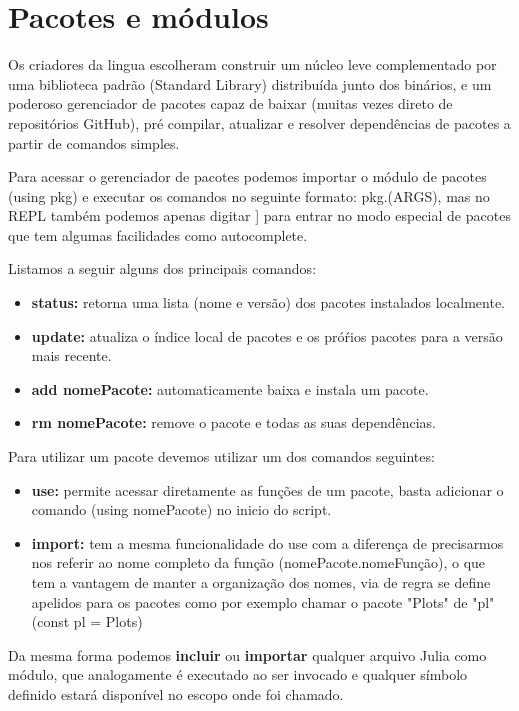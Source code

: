 \section{Pacotes e módulos}

Os criadores da lingua escolheram construir um núcleo leve complementado por uma biblioteca padrão (Standard Library) distribuída junto dos binários, e um poderoso gerenciador de pacotes capaz de baixar (muitas vezes direto de repositórios GitHub), pré compilar, atualizar e resolver dependências de pacotes a partir de comandos simples. 

Para acessar o gerenciador de pacotes podemos importar o módulo de pacotes (using pkg) e executar os comandos no seguinte formato: pkg.(ARGS), mas no REPL também podemos apenas digitar ] para entrar no modo especial de pacotes que tem algumas facilidades como autocomplete.

Listamos a seguir alguns dos principais comandos:
\begin{itemize}
    \item \textbf{status:} retorna uma lista (nome e versão) dos pacotes instalados localmente.
    \item \textbf{update:} atualiza o índice local de pacotes e os próŕios pacotes para a versão mais recente.
    \item \textbf{add nomePacote:} automaticamente baixa e instala um pacote.
    \item \textbf{rm nomePacote:} remove o pacote e todas as suas dependências.
\end{itemize}

Para utilizar um pacote devemos utilizar um dos comandos seguintes:
\begin{itemize}
    \item \textbf{use:} permite acessar diretamente as funções de um pacote, basta adicionar o comando (using nomePacote) no inicio do script. 
    \item \textbf{import:} tem a mesma funcionalidade do use com a diferença de precisarmos nos referir ao nome completo da função (nomePacote.nomeFunção), o que tem a vantagem de manter a organização dos nomes, via de regra se define apelidos para os pacotes como por exemplo chamar o pacote "Plots" de "pl" (const pl = Plots) %
\end{itemize}

Da mesma forma podemos \textbf{incluir} ou \textbf{importar} qualquer arquivo Julia como módulo, que analogamente é executado ao ser invocado e qualquer símbolo definido estará disponível no escopo onde foi chamado. 

